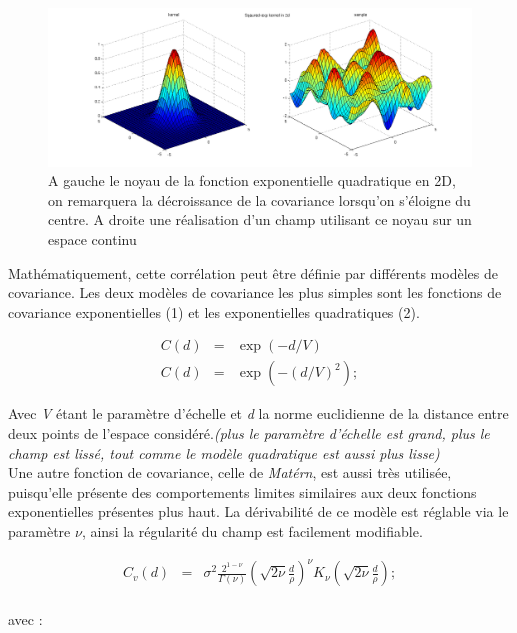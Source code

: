 \documentclass[a4paper,10pt]{article}
\begin{document}
\begin{figure}[H]
   \centering   \includegraphics[scale=0.25]{stochastic_process2d.png}
      \caption{A gauche le noyau de la fonction exponentielle quadratique en 2D, on remarquera la décroissance de la covariance lorsqu'on s'éloigne du centre. A droite une réalisation d'un champ utilisant ce noyau sur un espace continu}
         \label{realChamp}
\end{figure}

Mathématiquement, cette corrélation peut être définie par différents modèles de covariance. Les deux modèles de covariance les plus simples sont les fonctions de covariance exponentielles (1) et les exponentielles quadratiques (2).  

   \begin{eqnarray}
      				C(d) & = & \exp(-d/V)\\
                    C(d) & = & \exp(-(d/V)^{2});
   \end{eqnarray}
   
Avec \emph{V} étant le paramètre d'échelle et \emph{d} la norme euclidienne de la distance entre deux points de l'espace considéré.\textit{(plus le paramètre d'échelle est grand, plus le champ est lissé, tout comme le modèle quadratique est aussi plus lisse)}\\
Une autre fonction de covariance, celle de \emph{Matérn}, est aussi très utilisée, puisqu'elle présente des comportements limites similaires aux deux fonctions exponentielles présentes plus haut. La dérivabilité de ce modèle est réglable via le paramètre $\nu$, ainsi la régularité du champ est facilement modifiable.

   \begin{eqnarray}
C_{v}(d) & = & \sigma^{2}\frac{2^{1-\nu}}{\Gamma(\nu)}\left(\sqrt{2\nu}\frac{d}{\rho}\right)^{\nu}K_{\nu}\left(\sqrt{2\nu}\frac{d}{\rho}\right);
   \end{eqnarray}\\
   
avec :
	
\end{document}
